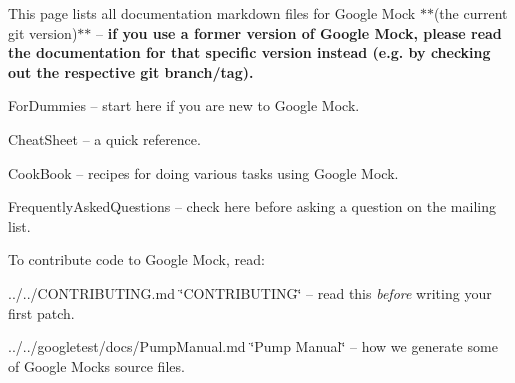 This page lists all documentation markdown files for Google Mock $\ast$$\ast$(the current git version)$\ast$$\ast$ -- {\bfseries if you use a former version of Google Mock, please read the documentation for that specific version instead (e.\+g. by checking out the respective git branch/tag).}


\begin{DoxyItemize}
\item For\+Dummies -- start here if you are new to Google Mock.
\item Cheat\+Sheet -- a quick reference.
\item Cook\+Book -- recipes for doing various tasks using Google Mock.
\item Frequently\+Asked\+Questions -- check here before asking a question on the mailing list.
\end{DoxyItemize}

To contribute code to Google Mock, read\+:


\begin{DoxyItemize}
\item ../../\+C\+O\+N\+T\+R\+I\+B\+U\+T\+I\+NG.md \char`\"{}\+C\+O\+N\+T\+R\+I\+B\+U\+T\+I\+N\+G\char`\"{} -- read this {\itshape before} writing your first patch.
\item ../../googletest/docs/\+Pump\+Manual.md \char`\"{}\+Pump Manual\char`\"{} -- how we generate some of Google Mock\textquotesingle{}s source files. 
\end{DoxyItemize}